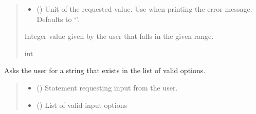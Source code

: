 \documentclass[letterpaper,10pt,english]{sphinxmanual}
\begin{document}
\begin{fulllineitems}
\begin{fulllineitems}
\begin{quote}
\begin{description}
\begin{itemize}
\item {} 
\sphinxAtStartPar
{} (\sphinxstyleliteralemphasis{\sphinxupquote{, }}) \textendash{} Unit of the requested value. Use when printing the error message.                 Defaults to ‘’.

\end{itemize}

\sphinxAtStartPar
Integer value given by the user that falls in the given range.

\sphinxAtStartPar
int

\end{description}\end{quote}

\end{fulllineitems}


\begin{fulllineitems}
\label{\detokenize{GetUserInput:GetUserInput.UserInput.AskForStrInList}}
\pysigstartsignatures
{}
\pysigstopsignatures
\sphinxAtStartPar
Asks the user for a string that exists in the list of valid options.
\begin{quote}\begin{description}
\begin{itemize}
\item {} 
\sphinxAtStartPar
{} () \textendash{} Statement requesting input from the user.

\item {} 
\sphinxAtStartPar
{} () \textendash{} List of valid input options


\end{itemize}
\end{description}
\end{quote}
\end{fulllineitems}
\end{fulllineitems}
\end{document}
